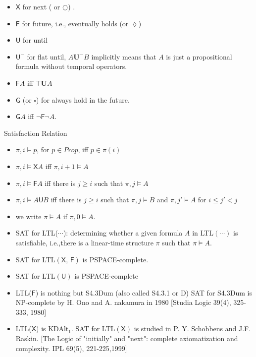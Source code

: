 \documentclass[12pt]{article}
\begin{document}
\begin{itemize}
\item $\textsf{X}$ for next ( or $\bigcirc$) .
\item $\textsf{F}$ for future, i.e., eventually holds (or $\lozenge$)
\item $\textsf{U}$ for until
\item $\textsf{U}^-$ for flat until, $A\mathbf{U}^-B$ implicitly means that $A$ is just a propositional formula without temporal operators.

\item $\textsf{F}A$ iff $\top\mathbf{U}A$

\item $\textsf{G}$ (or $\square$) for always hold in the future.
\item $\textsf{G}A$ iff $\neg \textsf{F}\neg A$.
\end{itemize}

Satisfaction Relation
\begin{itemize}
\item $\pi, i\models p$, for $p\in Prop$, iff $p\in \pi(i)$
 \item $\pi, i\models \textsf{X}A$ iff $\pi,i+1\models A$
 \item $\pi,i\models \textsf{F}A$ iff there is $j\geq i$ such that $\pi,j\models A$
 \item $\pi,i\models A\textsf{U} B$ iff there is $j\geq i$ such that $\pi,j\models B$ and $\pi,j'\models A$ for $i\leq j'<j$
\item we write $\pi\models A$ if $\pi,0\models A$.

\item SAT for LTL($\cdots$): determining whether a given formula $A$ in LTL$(\cdots)$ is satisfiable, i.e.,there is a linear-time structure $\pi$ such that $\pi\models A$.

\end{itemize}





\begin{itemize}
\item SAT for LTL$(\textsf{X, F})$ is PSPACE-complete.

\item SAT for LTL$(\textsf{U})$ is PSPACE-complete

\item LTL($\textsf{F}$) is nothing but S4.3Dum (also called S4.3.1 or D)
SAT for S4.3Dum is NP-complete by H. Ono and A. nakamura in 1980 [Studia Logic 39(4), 325-333, 1980]

\item LTL($\textsf{X}$) is KDAlt$_1$. SAT for LTL$(\textsf{X})$ is studied in  P. Y. Schobbens and J.F. Raskin. [The Logic of "initially" and "next": complete axiomatization and complexity. IPL 69(5), 221-225,1999]
\end{itemize}
\end{document}
